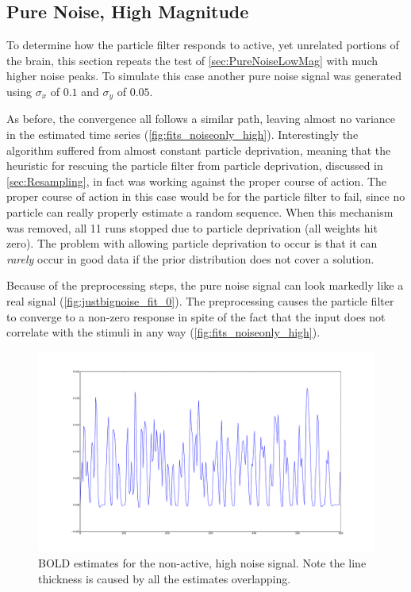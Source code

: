 \subsection{Pure Noise, High Magnitude}
\label{sec:PureNoiseHighMag}
To determine how the particle filter responds to active, yet unrelated
portions of the brain, this section repeats the test of \autoref{sec:PureNoiseLowMag} 
with much higher noise peaks. To simulate this case another
pure noise signal was generated using $\sigma_x$ of $0.1$ and $\sigma_y$ of $0.05$.

As before, the convergence all follows a similar path, leaving almost no
variance in the estimated time series (\autoref{fig:fits_noiseonly_high}). 
Interestingly the algorithm suffered from almost constant particle deprivation, 
meaning that the heuristic
for rescuing the particle filter from particle deprivation, discussed in
\autoref{sec:Resampling}, in fact was working against the proper course of action. 
The proper course of action in this case would be for the particle filter to fail,
since no particle can really properly estimate a random sequence. When this mechanism
was removed, all 11 runs stopped due to particle deprivation (all weights hit zero). 
The problem with allowing particle deprivation to occur is that it can \emph{rarely}
occur in good data if the prior distribution does not cover a solution. 

Because of the preprocessing steps, the pure noise signal can look markedly like a real
signal (\autoref{fig:justbignoise_fit_0}). The preprocessing causes the particle filter
to converge to a non-zero response in spite of the fact that the input does not correlate
with the stimuli in any way (\autoref{fig:fits_noiseonly_high}). 

\begin{figure}[H]
\centering
\includegraphics[clip=true,trim=6cm 2cm 5cm 3cm,width=15cm]{images/fits_noiseonly_high}
\caption{BOLD estimates for the non-active, high noise signal. Note the line thickness is caused
by all the estimates overlapping.}
\label{fig:fits_noiseonly_high}
\end{figure}

